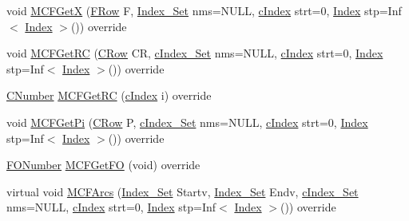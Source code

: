 \begin{DoxyCompactItemize}
\item 
void \mbox{\hyperlink{class_m_c_f_simplex_adfe83485d41648441446726b336069d1}{M\+C\+F\+GetX}} (\mbox{\hyperlink{class_m_c_f_class_a9dae1f1a39c208ce3c2b337cd5bb3d00}{F\+Row}} F, \mbox{\hyperlink{class_m_c_f_class_ace3388eb329ff0551a0b86b6c67e33d8}{Index\+\_\+\+Set}} nms=N\+U\+LL, \mbox{\hyperlink{class_m_c_f_class_a76aaabb20535c51a2752b93f6c38fe54}{c\+Index}} strt=0, \mbox{\hyperlink{class_m_c_f_class_ad53d6229d7ec28555a9c9c2fd9abf773}{Index}} stp=Inf$<$ \mbox{\hyperlink{class_m_c_f_class_ad53d6229d7ec28555a9c9c2fd9abf773}{Index}} $>$()) override
\item 
void \mbox{\hyperlink{class_m_c_f_simplex_a9cc0f8dbc79bf2fd7744a6ad32b3e985}{M\+C\+F\+Get\+RC}} (\mbox{\hyperlink{class_m_c_f_class_a62409402be4e4b301e1a568f99f877be}{C\+Row}} CR, \mbox{\hyperlink{class_m_c_f_class_a81575b2d4e4d5636b17170432150ae69}{c\+Index\+\_\+\+Set}} nms=N\+U\+LL, \mbox{\hyperlink{class_m_c_f_class_a76aaabb20535c51a2752b93f6c38fe54}{c\+Index}} strt=0, \mbox{\hyperlink{class_m_c_f_class_ad53d6229d7ec28555a9c9c2fd9abf773}{Index}} stp=Inf$<$ \mbox{\hyperlink{class_m_c_f_class_ad53d6229d7ec28555a9c9c2fd9abf773}{Index}} $>$()) override
\item 
\mbox{\hyperlink{class_m_c_f_class_a24d0627ba8213afe1ec4ebeb4508e8f1}{C\+Number}} \mbox{\hyperlink{class_m_c_f_simplex_af760d0f98c95f89378b36d14b4e98551}{M\+C\+F\+Get\+RC}} (\mbox{\hyperlink{class_m_c_f_class_a76aaabb20535c51a2752b93f6c38fe54}{c\+Index}} i) override
\item 
void \mbox{\hyperlink{class_m_c_f_simplex_abb97afaf7df33019f1b728138a254d6d}{M\+C\+F\+Get\+Pi}} (\mbox{\hyperlink{class_m_c_f_class_a62409402be4e4b301e1a568f99f877be}{C\+Row}} P, \mbox{\hyperlink{class_m_c_f_class_a81575b2d4e4d5636b17170432150ae69}{c\+Index\+\_\+\+Set}} nms=N\+U\+LL, \mbox{\hyperlink{class_m_c_f_class_a76aaabb20535c51a2752b93f6c38fe54}{c\+Index}} strt=0, \mbox{\hyperlink{class_m_c_f_class_ad53d6229d7ec28555a9c9c2fd9abf773}{Index}} stp=Inf$<$ \mbox{\hyperlink{class_m_c_f_class_ad53d6229d7ec28555a9c9c2fd9abf773}{Index}} $>$()) override
\item 
\mbox{\hyperlink{class_m_c_f_class_af5ee7b3099b0bc780a6a4b43629488fa}{F\+O\+Number}} \mbox{\hyperlink{class_m_c_f_simplex_a854a2b3ad7bb3cca0326c8f581a2d673}{M\+C\+F\+Get\+FO}} (void) override
\item 
virtual void \mbox{\hyperlink{class_m_c_f_simplex_a2bdbf170aeb8172faa6311e9655ada18}{M\+C\+F\+Arcs}} (\mbox{\hyperlink{class_m_c_f_class_ace3388eb329ff0551a0b86b6c67e33d8}{Index\+\_\+\+Set}} Startv, \mbox{\hyperlink{class_m_c_f_class_ace3388eb329ff0551a0b86b6c67e33d8}{Index\+\_\+\+Set}} Endv, \mbox{\hyperlink{class_m_c_f_class_a81575b2d4e4d5636b17170432150ae69}{c\+Index\+\_\+\+Set}} nms=N\+U\+LL, \mbox{\hyperlink{class_m_c_f_class_a76aaabb20535c51a2752b93f6c38fe54}{c\+Index}} strt=0, \mbox{\hyperlink{class_m_c_f_class_ad53d6229d7ec28555a9c9c2fd9abf773}{Index}} stp=Inf$<$ \mbox{\hyperlink{class_m_c_f_class_ad53d6229d7ec28555a9c9c2fd9abf773}{Index}} $>$()) override

\end{DoxyCompactItemize}
